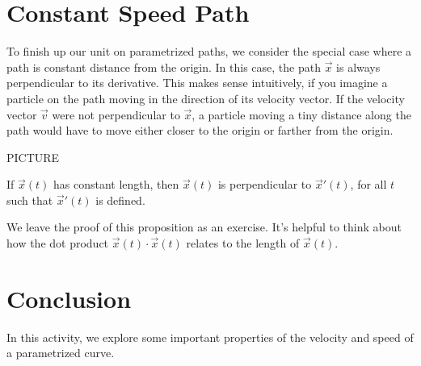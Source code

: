 \documentclass{ximera}
\begin{document}
\section*{Constant Speed Path}

To finish up our unit on parametrized paths, we consider the special case where a path is constant distance from the origin. In this case, the path $\vec{x}$ is always perpendicular to its derivative. This makes sense intuitively, if you imagine a particle on the path moving in the direction of its velocity vector. If the velocity vector $\vec{v}$ were not perpendicular to $\vec{x}$, a particle moving a tiny distance along the path would have to move either closer to the origin or farther from the origin.

PICTURE

\begin{proposition}
If $\vec{x}(t)$ has constant length, then $\vec{x}(t)$ is perpendicular to $\vec{x}'(t)$, for all $t$ such that $\vec{x}'(t)$ is defined.
\end{proposition}

We leave the proof of this proposition as an exercise. It's helpful to think about how the dot product $\vec{x}(t)\cdot\vec{x}(t)$ relates to the length of $\vec{x}(t)$.



\section*{Conclusion}

In this activity, we explore some important properties of the velocity and speed of a parametrized curve.
\end{document}
